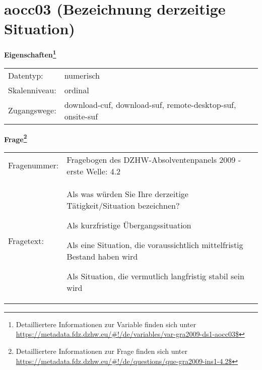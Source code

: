 
    \setcounter{footnote}{0}

    \vspace*{-1.8cm}
	\section{aocc03 (Bezeichnung derzeitige Situation)}
	\label{section:aocc03}



    \vspace*{0.5cm}
    \noindent\textbf{Eigenschaften\footnote{Detailliertere Informationen zur Variable finden sich unter
		\url{https://metadata.fdz.dzhw.eu/\#!/de/variables/var-gra2009-ds1-aocc03$}}}\\
	\begin{tabularx}{\hsize}{@{}lX}
	Datentyp: & numerisch \\
	Skalenniveau: & ordinal \\
	Zugangswege: &
	  download-cuf, 
	  download-suf, 
	  remote-desktop-suf, 
	  onsite-suf
 \\
    \end{tabularx}



				\vspace*{0.5cm}
                \noindent\textbf{Frage\footnote{Detailliertere Informationen zur Frage finden sich unter
		              \url{https://metadata.fdz.dzhw.eu/\#!/de/questions/que-gra2009-ins1-4.2$}}}\\
				\begin{tabularx}{\hsize}{@{}lX}
					Fragenummer: &
					  Fragebogen des DZHW-Absolventenpanels 2009 - erste Welle:
					  4.2
 \\
					Fragetext: & Als was würden Sie Ihre derzeitige Tätigkeit/Situation bezeichnen?\par  Als kurzfristige Übergangssituation\par  Als eine Situation, die voraussichtlich mittelfristig Bestand haben wird\par  Als Situation, die vermutlich langfristig stabil sein wird \\
				\end{tabularx}






